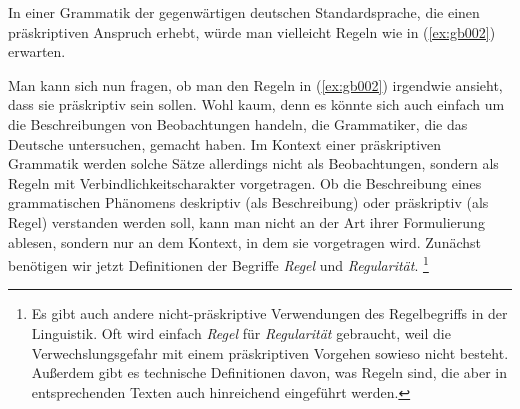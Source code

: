In einer Grammatik der gegenwärtigen deutschen Standardsprache, die einen präskriptiven Anspruch erhebt, würde man vielleicht Regeln wie in (\ref{ex:gb002}) erwarten.

\begin{exe}
  \ex\label{ex:gb002}
  \begin{xlist}
  \end{xlist}
\end{exe}

Man kann sich nun fragen, ob man den Regeln in (\ref{ex:gb002}) irgendwie ansieht, dass sie präskriptiv sein sollen.
Wohl kaum, denn es könnte sich auch einfach um die Beschreibungen von Beobachtungen handeln, die Grammatiker, die das Deutsche untersuchen, gemacht haben.
Im Kontext einer präskriptiven Grammatik werden solche Sätze allerdings nicht als Beobachtungen, sondern als Regeln mit Verbindlichkeitscharakter vorgetragen.
Ob die Beschreibung eines grammatischen Phänomens deskriptiv (als Beschreibung) oder präskriptiv (als Regel) verstanden werden soll, kann man nicht an der Art ihrer Formulierung ablesen, sondern nur an dem Kontext, in dem sie vorgetragen wird.
Zunächst benötigen wir jetzt Definitionen der Begriffe \textit{Regel} und \textit{Regularität}.%
\footnote{Es gibt auch andere nicht-präskriptive Verwendungen des Regelbegriffs in der Linguistik.
Oft wird einfach \textit{Regel} für \textit{Regularität} gebraucht, weil die Verwechslungsgefahr mit einem präskriptiven Vorgehen sowieso nicht besteht.
Außerdem gibt es technische Definitionen davon, was Regeln sind, die aber in entsprechenden Texten auch hinreichend eingeführt werden.}




